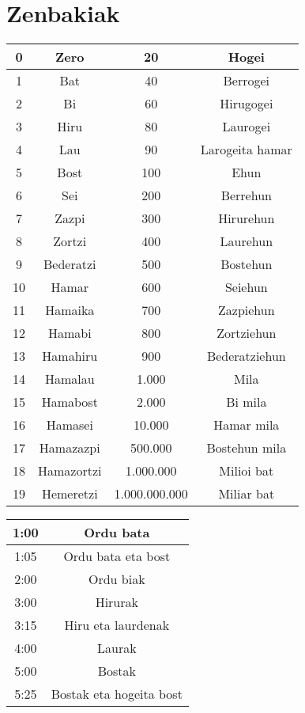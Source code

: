 \documentclass[12pt, a4paper, landscape]{article}
\begin{document}
\section{Zenbakiak}
\begin{table}[h]
\begin{center}
\begin{tabular}{|c|c||c|c|}
\hline
0 & Zero & 20 & Hogei\\
\hline
1 & Bat & 40 & Berrogei\\
\hline
2 & Bi & 60 & Hirugogei\\
\hline
3 & Hiru & 80 & Laurogei\\
\hline
4 & Lau & 90 & Larogeita hamar\\
\hline
5 & Bost & 100 & Ehun\\
\hline
6 & Sei & 200 & Berrehun\\
\hline
7 & Zazpi & 300 & Hirurehun\\
\hline
8 & Zortzi & 400 & Laurehun\\
\hline
9 & Bederatzi & 500 & Bostehun\\
\hline
10 & Hamar & 600 & Seiehun\\
\hline
11 & Hamaika & 700 & Zazpiehun\\
\hline
12 & Hamabi & 800 & Zortziehun\\
\hline
13 & Hamahiru & 900 & Bederatziehun\\
\hline
14 & Hamalau & 1.000 & Mila\\
\hline
15 & Hamabost & 2.000 & Bi mila\\
\hline
16 & Hamasei & 10.000 & Hamar mila\\
\hline
17 & Hamazazpi & 500.000 & Bostehun mila\\
\hline
18 & Hamazortzi & 1.000.000 & Milioi bat\\
\hline
19 & Hemeretzi & 1.000.000.000 & Miliar bat\\
\hline
\end{tabular}
\quad
\begin{tabular}{|c|c|}
\hline
1:00 & Ordu bata\\
\hline
1:05 & Ordu bata eta bost\\
\hline
2:00 & Ordu biak\\
\hline
3:00 & Hirurak\\
\hline
3:15 & Hiru eta laurdenak\\
\hline
4:00 & Laurak\\
\hline
5:00 & Bostak\\
\hline
5:25 & Bostak eta hogeita bost\\

\end{tabular}
\end{center}
\end{table}
\end{document}
